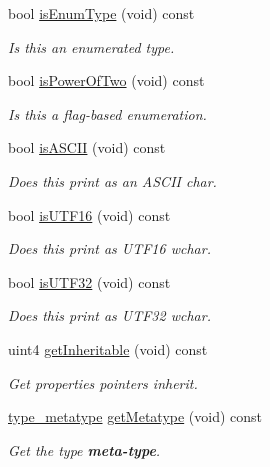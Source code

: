 \begin{DoxyCompactItemize}
bool \mbox{\hyperlink{class_datatype_adb1f8990ba5c131acbefbfcdb1686708}{is\+Enum\+Type}} (void) const
\begin{DoxyCompactList}\small\item\em Is this an enumerated type. \end{DoxyCompactList}\item 
bool \mbox{\hyperlink{class_datatype_a5cb816c9455528b396ad1b6cbf16dbdf}{is\+Power\+Of\+Two}} (void) const
\begin{DoxyCompactList}\small\item\em Is this a flag-\/based enumeration. \end{DoxyCompactList}\item 
bool \mbox{\hyperlink{class_datatype_a6f3de8c7f2381dde345f5993ae83ebb5}{is\+A\+S\+C\+II}} (void) const
\begin{DoxyCompactList}\small\item\em Does this print as an A\+S\+C\+II \textquotesingle{}char\textquotesingle{}. \end{DoxyCompactList}\item 
bool \mbox{\hyperlink{class_datatype_a16d6ad1187428213dcdce8353bf91505}{is\+U\+T\+F16}} (void) const
\begin{DoxyCompactList}\small\item\em Does this print as U\+T\+F16 \textquotesingle{}wchar\textquotesingle{}. \end{DoxyCompactList}\item 
bool \mbox{\hyperlink{class_datatype_a6d14288e0d2a8998920b29f1e614bf3c}{is\+U\+T\+F32}} (void) const
\begin{DoxyCompactList}\small\item\em Does this print as U\+T\+F32 \textquotesingle{}wchar\textquotesingle{}. \end{DoxyCompactList}\item 
uint4 \mbox{\hyperlink{class_datatype_aa33df89b91441c409f59676d7bc1b0bd}{get\+Inheritable}} (void) const
\begin{DoxyCompactList}\small\item\em Get properties pointers inherit. \end{DoxyCompactList}\item 
\mbox{\hyperlink{type_8hh_aef6429f2523cdf4d415ba04a0209e61f}{type\+\_\+metatype}} \mbox{\hyperlink{class_datatype_abcf2621c981c277f00a53b4526b3e610}{get\+Metatype}} (void) const
\begin{DoxyCompactList}\small\item\em Get the type {\bfseries{meta-\/type}}. \end{DoxyCompactList}\item 

\end{DoxyCompactItemize}
